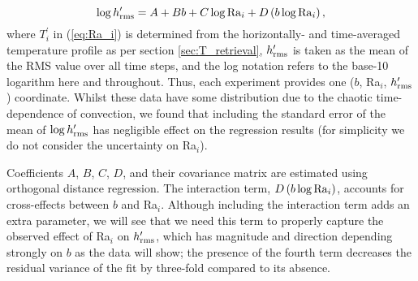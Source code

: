 \begin{equation} \label{eq:h_Ra_scaling}
\log h_{\rm rms}^\prime = A  + B b + C\log{\rm Ra}_i + D \left(b  \log{\rm Ra}_i\right),
\end{equation}
where $T_i^\prime$ in (\ref{eq:Ra_i}) is determined from the horizontally- and time-averaged temperature profile as per section \ref{sec:T_retrieval}, $h_{\rm rms}^\prime$ is taken as the mean of the RMS value over all time steps, and the log notation refers to the base-10 logarithm here and throughout. Thus, each experiment provides one ($b$, Ra$_i$, $h_{\rm rms}^\prime$) coordinate. Whilst these data have some distribution due to the chaotic time-dependence of convection, we found that including the standard error of the mean of $\log h_{\rm rms}^\prime$ has negligible effect on the regression results (for simplicity we do not consider the uncertainty on Ra$_i$). 

Coefficients $A$, $B$, $C$, $D$, and their covariance matrix are estimated using orthogonal distance regression. The interaction term, $D \left(b  \log{\rm Ra}_i\right)$, accounts for cross-effects between $b$ and Ra$_i$. Although including the interaction term adds an extra parameter, we will see that we need this term to properly capture the observed effect of Ra$_i$ on $h_{\rm rms}^\prime$, which has magnitude and direction depending strongly on $b$ as the data will show; the presence of the fourth term decreases the residual variance of the fit by three-fold compared to its absence. 






